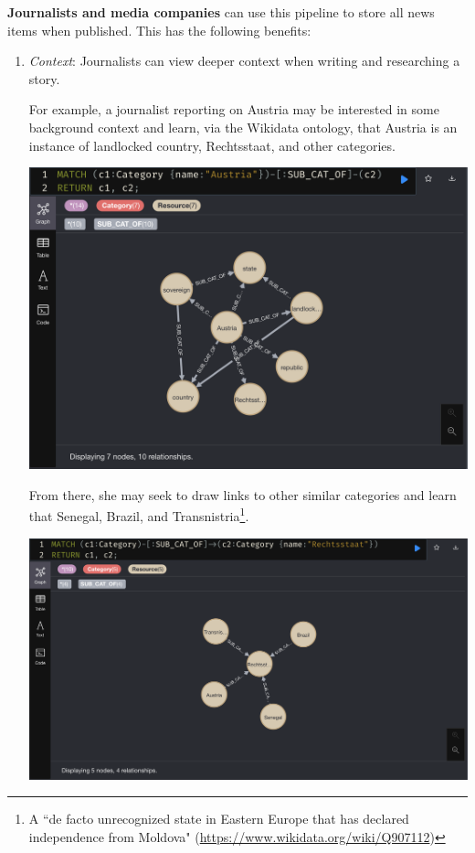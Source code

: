 \documentclass[11pt]{article}
\begin{document}
\textbf{Journalists and media companies} can use this pipeline to store all news items when published. This has the following benefits:
\begin{enumerate}
  \item{
    \textit{Context}: Journalists can view deeper context when writing and researching a story.

    For example, a journalist reporting on Austria may be interested in some background context and learn, via the Wikidata ontology, that Austria is an instance of landlocked country, Rechtsstaat, and other categories.
  
    \centerline{\includegraphics[scale=0.3]{use-case-1a}}

    From there, she may seek to draw links to other similar categories and learn that Senegal, Brazil, and Transnistria\footnote{A ``de facto unrecognized state in Eastern Europe that has declared independence from Moldova" (\url{https://www.wikidata.org/wiki/Q907112})}.
  
    \centerline{\includegraphics[scale=0.3]{use-case-1b}}

}
\end{enumerate}
\end{document}
